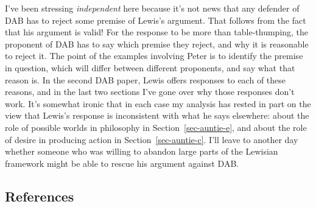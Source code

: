 \documentclass[
  11pt,
  letterpaper,
  DIV=11,
  numbers=noendperiod,
  twoside]{scrartcl}
\begin{document}
I've been stressing \emph{independent} here because it's not news that
any defender of DAB has to reject some premise of Lewis's argument. That
follows from the fact that his argument is valid! For the response to be
more than table-thumping, the proponent of DAB has to say which premise
they reject, and why it is reasonable to reject it. The point of the
examples involving Peter is to identify the premise in question, which
will differ between different proponents, and say what that reason is.
In the second DAB paper, Lewis offers responses to each of these
reasons, and in the last two sections I've gone over why those responses
don't work. It's somewhat ironic that in each case my analysis has
rested in part on the view that Lewis's response is inconsistent with
what he says elsewhere: about the role of possible worlds in philosophy
in Section~\ref{sec-auntie-e}, and about the role of desire in producing
action in Section~\ref{sec-auntie-c}. I'll leave to another day whether
someone who was willing to abandon large parts of the Lewisian framework
might be able to rescue his argument against DAB.

\subsection*{References}\label{references}
\end{document}

